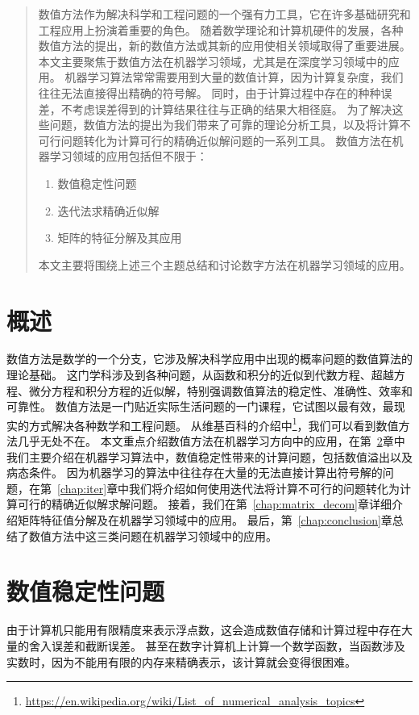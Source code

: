 \begin{abstract}
	数值方法作为解决科学和工程问题的一个强有力工具，它在许多基础研究和工程应用上扮演着重要的角色。
	随着数学理论和计算机硬件的发展，各种数值方法的提出，新的数值方法或其新的应用使相关领域取得了重要进展。
	本文主要聚焦于数值方法在机器学习领域，尤其是在深度学习领域中的应用。
	机器学习算法常常需要用到大量的数值计算，因为计算复杂度，我们往往无法直接得出精确的符号解。
	同时，由于计算过程中存在的种种误差，不考虑误差得到的计算结果往往与正确的结果大相径庭。
	为了解决这些问题，数值方法的提出为我们带来了可靠的理论分析工具，以及将计算不可行问题转化为计算可行的精确近似解问题的一系列工具。
	数值方法在机器学习领域的应用包括但不限于：
	\begin{enumerate}
		\item 数值稳定性问题
		\item 迭代法求精确近似解
		\item 矩阵的特征分解及其应用
	\end{enumerate}
	本文主要将围绕上述三个主题总结和讨论数字方法在机器学习领域的应用。

\end{abstract}

\chapter{概述}
\label{chap:intro}
数值方法是数学的一个分支，它涉及解决科学应用中出现的概率问题的数值算法的理论基础。
这门学科涉及到各种问题，从函数和积分的近似到代数方程、超越方程、微分方程和积分方程的近似解，特别强调数值算法的稳定性、准确性、效率和可靠性。
数值方法是一门贴近实际生活问题的一门课程，它试图以最有效，最现实的方式解决各种数学和工程问题。
从维基百科的介绍中\footnote{\url{https://en.wikipedia.org/wiki/List_of_numerical_analysis_topics}}，我们可以看到数值方法几乎无处不在。
本文重点介绍数值方法在机器学习方向中的应用，在第~\ref{chap:num_cond}章中我们主要介绍在机器学习算法中，数值稳定性带来的计算问题，包括数值溢出以及病态条件。
因为机器学习的算法中往往存在大量的无法直接计算出符号解的问题，在第~\ref{chap:iter}章中我们将介绍如何使用迭代法将计算不可行的问题转化为计算可行的精确近似解求解问题。
接着，我们在第~\ref{chap:matrix_decom}章详细介绍矩阵特征值分解及在机器学习领域中的应用。
最后，第~\ref{chap:conclusion}章总结了数值方法中这三类问题在机器学习领域中的应用。

\chapter{数值稳定性问题}
\label{chap:num_cond}
由于计算机只能用有限精度来表示浮点数，这会造成数值存储和计算过程中存在大量的舍入误差和截断误差。
甚至在数字计算机上计算一个数学函数，当函数涉及实数时，因为不能用有限的内存来精确表示，该计算就会变得很困难。



